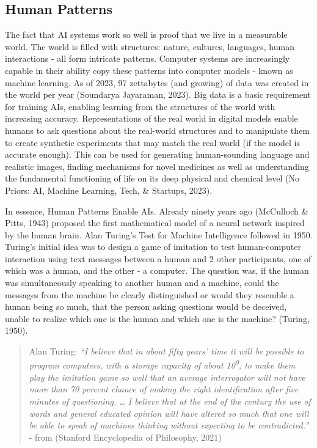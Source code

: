 \documentclass[
  letterpaper,
  DIV=11,
  numbers=noendperiod]{scrartcl}
\begin{document}
\subsection{Human Patterns}\label{human-patterns}

The fact that AI systems work so well is proof that we live in a
measurable world. The world is filled with structures: nature, cultures,
languages, human interactions - all form intricate patterns. Computer
systems are increasingly capable in their ability copy these patterns
into computer models - known as machine learning. As of 2023, 97
zettabytes (and growing) of data was created in the world per year
(Soundarya Jayaraman, 2023). Big data is a basic requirement for
training AIs, enabling learning from the structures of the world with
increasing accuracy. Representations of the real world in digital models
enable humans to ask questions about the real-world structures and to
manipulate them to create synthetic experiments that may match the real
world (if the model is accurate enough). This can be used for generating
human-sounding language and realistic images, finding mechanisms for
novel medicines as well as understanding the fundamental functioning of
life on its deep physical and chemical level (No Priors: AI, Machine
Learning, Tech, \& Startups, 2023).

In essence, Human Patterns Enable AIs. Already ninety years ago
(McCulloch \& Pitts, 1943) proposed the first mathematical model of a
neural network inspired by the human brain. Alan Turing's Test for
Machine Intelligence followed in 1950. Turing's initial idea was to
design a game of imitation to test human-computer interaction using text
messages between a human and 2 other participants, one of which was a
human, and the other - a computer. The question was, if the human was
simultaneously speaking to another human and a machine, could the
messages from the machine be clearly distinguished or would they
resemble a human being so much, that the person asking questions would
be deceived, unable to realize which one is the human and which one is
the machine? (Turing, 1950).

\begin{quote}
Alan Turing: \emph{``I believe that in about fifty years' time it will
be possible to program computers, with a storage capacity of about
10\textsuperscript{9}, to make them play the imitation game so well that
an average interrogator will not have more than 70 percent chance of
making the right identification after five minutes of questioning.
\ldots{} I believe that at the end of the century the use of words and
general educated opinion will have altered so much that one will be able
to speak of machines thinking without expecting to be contradicted.''} -
from (Stanford Encyclopedia of Philosophy, 2021)
\end{quote}
\end{document}
